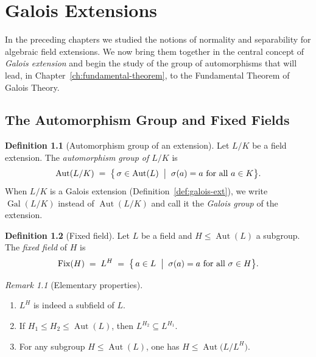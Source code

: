 \documentclass[12pt,a4paper,openany]{book}
\theoremstyle{definition}
\newtheorem{definition}{Definition}[chapter]
\theoremstyle{remark}
\newtheorem{remark}{Remark}[chapter]
\DeclareMathOperator{\Gal}{Gal}
\DeclareMathOperator{\Aut}{Aut}
\DeclareMathOperator{\Fix}{Fix}
\begin{document}
\chapter{Galois Extensions}\label{ch:galois-extensions}

In the preceding chapters we studied the notions of normality and
separability for algebraic field extensions.  We now bring them together
in the central concept of \emph{Galois extension} and begin the study of
the group of automorphisms that will lead, in Chapter~\ref{ch:fundamental-theorem},
to the Fundamental Theorem of Galois Theory.

\section{The Automorphism Group and Fixed Fields}
\label{sec:aut-fixed}

\begin{definition}[Automorphism group of an extension]\label{def:aut-extension}
Let $L/K$ be a field extension.  The \emph{automorphism group of $L/K$} is
\[
  \Aut(L/K) \;=\; \bigl\{\,\sigma\in\Aut(L) \;\bigm|\;
        \sigma(a)=a \text{ for all } a\in K\bigr\}.
\]
When $L/K$ is a Galois extension (Definition~\ref{def:galois-ext}), we write
$\Gal(L/K)$ instead of $\Aut(L/K)$ and call it the
\emph{Galois group} of the extension.
\end{definition}

\begin{definition}[Fixed field]\label{def:fixed-field}
Let $L$ be a field and $H\leq\Aut(L)$ a subgroup.  The \emph{fixed field}
of $H$ is
\[
  \Fix(H) \;=\; L^{H} \;=\;
  \bigl\{\,a\in L \;\bigm|\; \sigma(a)=a \text{ for all } \sigma\in H\bigr\}.
\]
\end{definition}

\begin{remark}[Elementary properties]\label{rem:fixed-elementary}
\begin{enumerate}
\item $L^{H}$ is indeed a subfield of $L$.
\item If $H_{1}\leq H_{2}\leq\Aut(L)$, then $L^{H_{2}}\subseteq L^{H_{1}}$.
\item For any subgroup $H\leq\Aut(L)$, one has
      $H\leq\Aut\!\bigl(L/L^{H}\bigr)$.
\end{enumerate}
\end{remark}
\end{document}
